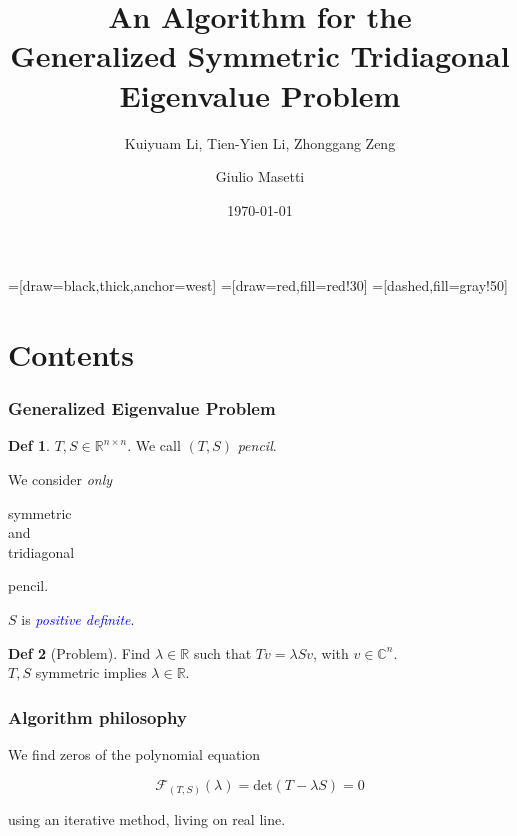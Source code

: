 \documentclass{beamer}
\title{An Algorithm for the \\
Generalized Symmetric Tridiagonal \\
Eigenvalue Problem}
\subtitle{Kuiyuam Li, Tien-Yien Li, Zhonggang Zeng}
\author{Giulio Masetti}
\institute{Universit\`a di Pisa\\
Corso Metodi di Approssimazione 2012-2013
}
\date{\today}
\newcommand{\R}{\mathbb{R}}
\newcommand{\C}{\mathbb{C}}
\newcommand{\effe}[2]{\mathcal{F}_{#1}(#2)}
\newcommand{\deter}[1]{\mathrm{det}(#1)}
\newcommand{\tc}{ $ such that $ }
\theoremstyle{definition} \newtheorem{de}{Def}
\theoremstyle{remark} \newtheorem{os}[de]{Remark}
\theoremstyle{plain} \newtheorem{te}[de]{Teo}
\theoremstyle{plain} \newtheorem{co}[de]{Cor}
\theoremstyle{plain} \newtheorem{pr}[de]{Prop}
\theoremstyle{plain} \newtheorem{lem}[de]{Lemm}
\theoremstyle{remark} \newtheorem{rem}[de]{Remark}
\begin{document}
\long{} 

=[draw=black,thick,anchor=west]
=[draw=red,fill=red!30]
=[dashed,fill=gray!50]

\newenvironment{fminipage}%
{\begin{Sbox}\begin{minipage}}%
{\end{minipage}
\end{Sbox}
\fbox{\TheSbox}}

\begin{frame}
  \titlepage
\end{frame}


\section{Contents}

\begin{frame} 
\frametitle{Generalized Eigenvalue Problem}  

\begin{de}
  $T,S\in\R^{n\times n}$. We call $(T,S)$ \emph{pencil}.
\end{de}

We consider \emph{only} \begin{fminipage}{0.8in} symmetric \\ and \\ 
tridiagonal\end{fminipage} pencil.

\pause

$S$ is \textcolor{blue}{\emph{positive definite}}.

\pause

\begin{de}[Problem]
  Find $\lambda\in\R \tc T v = \lambda S v$, with $v\in\C^n$. \\
  $T,S$ symmetric implies $\lambda\in\R$.
\end{de}
\end{frame}

\begin{frame}
\frametitle{Algorithm philosophy}

We find zeros of the polynomial equation

\begin{equation*}
  \effe{(T,S)}{\lambda} = \deter{T-\lambda S} = 0
\end{equation*}

using an iterative method, living on real line.
\end{frame}
\end{document}
